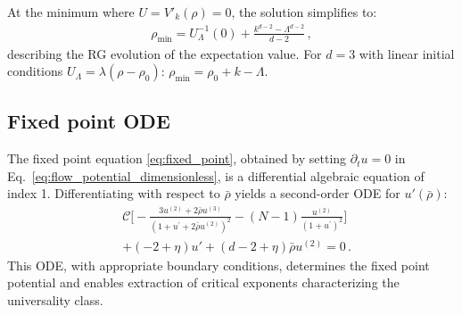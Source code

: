 \documentclass[reprint,twocolumn,superscriptaddress,preprintnumbers,amsmath,amssymb,aps,prd,floatfix]{revtex4-2}
\def\Eq#1{Eq.~\eqref{#1}}
\begin{document}
At the minimum where $U = V'_k(\rho) = 0$, the solution simplifies to:
\begin{align}
	\rho_{\text{min}}=U_\Lambda^{-1}(0)+\frac{k^{d-2}-\Lambda^{d-2}}{d-2}\,,
\end{align}
describing the RG evolution of the expectation value. For $d=3$ with linear initial conditions $U_\Lambda=\lambda(\rho-\rho_0)$: $\rho_{\text{min}}=\rho_0+k-\Lambda$.

\subsection{Fixed point ODE}
\label{app:fixedpoint_ode}

The fixed point equation \eqref{eq:fixed_point}, obtained by setting $\partial_t u = 0$ in \Eq{eq:flow_potential_dimensionless}, is a differential algebraic equation of index 1. Differentiating with respect to $\bar{\rho}$ yields a second-order ODE for $u'(\bar{\rho})$:
\begin{align}
	&\mathscr{C}\Bigg[-\frac{3 u^{(2)}+2 \bar{\rho} u^{(3)}}{\left(1+u^{\prime}+2 \bar{\rho} u^{(2)}\right)^2}-(N-1) \frac{u^{(2)}}{\left(1+u^{\prime}\right)^2}\Bigg]\nonumber\\[2ex]
	&+(-2+\eta)u'+(d-2+\eta)\bar{\rho}u^{(2)}=0\,.
\end{align}
This ODE, with appropriate boundary conditions, determines the fixed point potential and enables extraction of critical exponents characterizing the universality class.
% 



	
\end{document}
